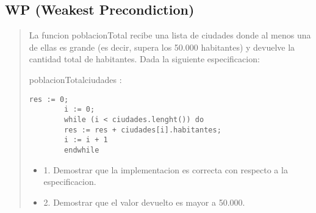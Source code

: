\documentclass[10pt,a4paper]{article}
\begin{document}
\subsection{WP (Weakest Precondiction)}
\begin{quote}
	La funcion poblacionTotal recibe una lista de ciudades donde al menos una de ellas es grande (es decir, supera los
	50.000 habitantes) y devuelve la cantidad total de habitantes. Dada la siguiente especificacion:
	\begin{proc}{poblacionTotal}{\In ciudades : }{\ent}
	\end{proc}
	\begin{lstlisting}[caption={},label=code:for]
		res := 0;
		i := 0;
		while (i < ciudades.lenght()) do
		res := res + ciudades[i].habitantes;
		i := i + 1
		endwhile
	\end{lstlisting}
	\begin{itemize}
		\item1. Demostrar que la implementacion es correcta con respecto a la especificacion.
		\item2. Demostrar que el valor devuelto es mayor a 50.000.
	\end{itemize}
\end{quote}
\end{document}
